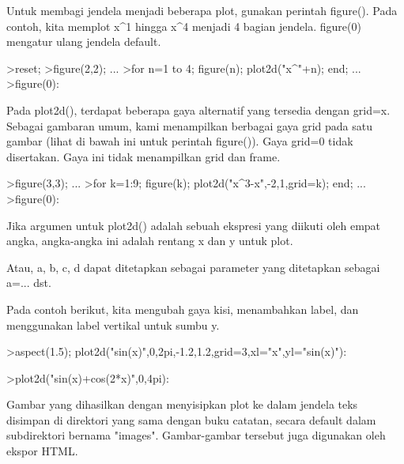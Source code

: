 \documentclass[12pt,arial,letterpaper]{book}
\begin{document}
\begin{eulernootebook}
\begin{eulercomment}
\begin{eulercomment}
\begin{eulernootebook}
\begin{eulercomment}
\begin{eulercomment}
\begin{eulercomment}
\begin{eulercomment}
\begin{eulercomment}
\begin{eulercomment}
\begin{eulercomment}
\begin{eulernotebook}
\begin{eulercomment}
\begin{eulercomment}
\begin{eulercomment}
Untuk membagi jendela menjadi beberapa plot, gunakan perintah
figure(). Pada contoh, kita memplot x\textasciicircum{}1 hingga x\textasciicircum{}4 menjadi 4 bagian
jendela. figure(0) mengatur ulang jendela default.
\end{eulercomment}
\begin{eulerprompt}
>reset;
>figure(2,2); ...
>for n=1 to 4; figure(n); plot2d("x^"+n); end; ...
>figure(0):
\end{eulerprompt}
\begin{eulercomment}
Pada plot2d(), terdapat beberapa gaya alternatif yang tersedia dengan
grid=x. Sebagai gambaran umum, kami menampilkan berbagai gaya grid
pada satu gambar (lihat di bawah ini untuk perintah figure()). Gaya
grid=0 tidak disertakan. Gaya ini tidak menampilkan grid dan frame.
\end{eulercomment}
\begin{eulerprompt}
>figure(3,3); ...
>for k=1:9; figure(k); plot2d("x^3-x",-2,1,grid=k); end; ...
>figure(0):
\end{eulerprompt}
\begin{eulercomment}
Jika argumen untuk plot2d() adalah sebuah ekspresi yang diikuti oleh
empat angka, angka-angka ini adalah rentang x dan y untuk plot.

Atau, a, b, c, d dapat ditetapkan sebagai parameter yang ditetapkan
sebagai a=... dst.

Pada contoh berikut, kita mengubah gaya kisi, menambahkan label, dan
menggunakan label vertikal untuk sumbu y.
\end{eulercomment}
\begin{eulerprompt}
>aspect(1.5); plot2d("sin(x)",0,2pi,-1.2,1.2,grid=3,xl="x",yl="sin(x)"):
\end{eulerprompt}
\begin{eulerprompt}
>plot2d("sin(x)+cos(2*x)",0,4pi):
\end{eulerprompt}
\begin{eulercomment}
Gambar yang dihasilkan dengan menyisipkan plot ke dalam jendela teks
disimpan di direktori yang sama dengan buku catatan, secara default
dalam subdirektori bernama "images". Gambar-gambar tersebut juga
digunakan oleh ekspor HTML.


\end{eulercomment}
\end{eulercomment}
\end{eulercomment}
\end{eulernotebook}
\end{eulercomment}
\end{eulercomment}
\end{eulercomment}
\end{eulercomment}
\end{eulercomment}
\end{eulercomment}
\end{eulercomment}
\end{eulernootebook}
\end{eulercomment}
\end{eulercomment}
\end{eulernootebook}
\end{document}
